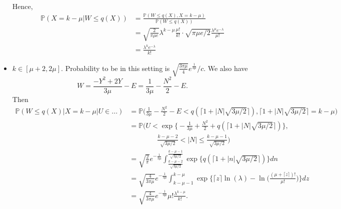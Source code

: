 \documentclass[a4paper,11pt]{article}
\theoremstyle{plain}
\theoremstyle{definition}
\newcommand{\MP}{\mathbb{P}}
\begin{document}
\begin{itemize}
		Hence,
		\[ 
		\begin{aligned}
		\MP(X = k - \mu | W \leq q(X)) &= \frac{\MP(W \leq q(X), X = k - \mu) }{\MP(W \leq q(X))} \\
		&= \sqrt{\frac{2}{\pi \mu e}} \lambda^{k-\mu} \frac{\mu!}{k!} \cdot \sqrt{\pi \mu e / 2} \frac{\lambda^\mu e^{-\lambda}}{\mu!} \\
		&= \frac{\lambda^{k} e^{-\lambda}}{k!}
		\end{aligned} 
		\]
		
		\item $k \in [\mu + 2, 2 \mu]$. Probability to be in this setting is $\sqrt{\frac{3\pi \mu}{4}} e^{\frac{1}{3\mu}} / c$. We also have
		\[ W = \frac{-Y^2+2Y}{3\mu} - E = \frac{1}{3\mu}-\frac{N^2}{2} - E. \]
		Then
		\[
		\begin{aligned}
		\MP(W \leq q(X) | X = k-\mu | U \in ...) &= \MP\Bigg(\frac{1}{3\mu}-\frac{N^2}{2} - E < q( \lceil 1+|N| \sqrt{3\mu/2} \rceil ),
		\lceil 1+|N| \sqrt{3\mu/2} \rceil = k - \mu\Bigg) \\
		& = \MP\Bigg(U < \exp \Big \{-\frac{1}{3\mu} + \frac{N^2}{2} + q( \lceil 1+|N| \sqrt{3\mu/2} \rceil ) \Big\}, \\ 
		& \qquad \qquad \frac{k-\mu-2}{\sqrt{3\mu/2}} < |N| \leq \frac{k-\mu-1}{\sqrt{3\mu/2}} \Bigg) \\
		& = \sqrt{\frac{2}{\pi}} e^{-\frac{1}{3\mu}} \int_{\frac{k-\mu-2}{\sqrt{3\mu/2}}}^{\frac{k-\mu-1}{\sqrt{3\mu/2}}} \exp \Big \{  q( \lceil 1+|n| \sqrt{3\mu/2} \rceil ) \Big\} dn \\
		& =  \sqrt{\frac{4}{3\pi\mu}} e^{-\frac{1}{3\mu}}  \int_{k-\mu-1}^{k-\mu} \exp \Big \{ \lceil z \rceil \ln(\lambda) - \ln\bigg( \frac{(\mu + \lceil z \rceil)!}{\mu!} \bigg) \Big\} dz \\
		& = \sqrt{\frac{4}{3\pi\mu}} e^{-\frac{1}{3\mu}}\mu! \frac{\lambda^{k-\mu}}{k!}.
		\end{aligned}
		\]
		

\end{itemize}
\end{document}
